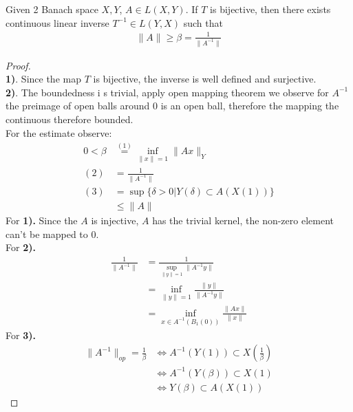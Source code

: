 \begin{corollary}
Given 2 Banach space $X, Y$, $A \in L(X, Y)$. If $T$ is bijective, then there exists continuous linear inverse $T^{-1} \in L(Y, X)$ such that 
\begin{align*}
	\|A\| \ge \beta = \frac{1}{\|A^{-1}\|}
\end{align*}
\end{corollary}
\begin{proof}\quad\\
\textbf{1)}. Since the map $T$ is bijective, the inverse is well defined and surjective.\\
\textbf{2)}. The boundedness i
s trivial, apply open mapping theorem we observe for $A^{-1}$ the preimage of open balls around 0 is an open ball, therefore the mapping the continuous therefore bounded. \\
	For the estimate observe:
	\begin{align*}
		0< \beta &\overset{(1)}{=} \inf_{\|x\| = 1} \| Ax\|_Y \\
	(2)	&= \frac{1}{\|A^{-1}\|} \\
	(3)	&= \sup \{ \delta > 0| Y(\delta) \subset A(X(1))\}\\
		&\le \|A\|
	\end{align*}
	For \textbf{1).} Since the $A$ is injective, $A$ has the trivial kernel, the non-zero element can't be mapped to 0. \\
	For \textbf{2).} 
	\begin{align*}
		\frac{1}{\|A^{-1}\|}
		&=\frac{1}{\sup_{\|y\| = 1} \|A^{-1}y\|} \\
		&= \inf_{\|y \| = 1} \frac{\|y\|}{\|A^{-1}y\|}\\
		&= \inf_{x \in A^{-1}(B_1(0))} \frac{\|Ax\|}{\|x\|}
	\end{align*}
	For \textbf{3).}
	\begin{align*}
		\|A^{-1}\|_{op} = \frac{1}{\beta}
		&\Leftrightarrow A^{-1}(Y(1)) \subset X(\frac{1}{\beta})\\
		&\Leftrightarrow A^{-1}(Y(\beta)) \subset X(1)\\
		&\Leftrightarrow Y(\beta) \subset A(X(1))
	\end{align*}
\end{proof}

